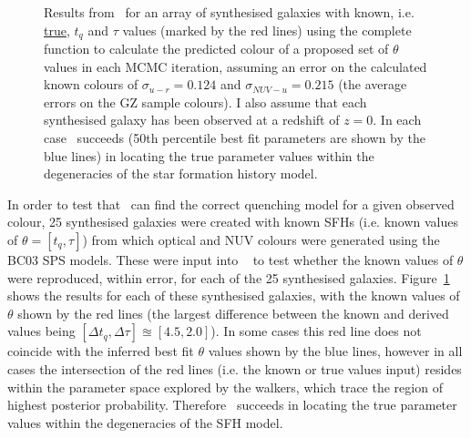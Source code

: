 \begin{figure}
\caption[Testing \starpy]{Results from \starpy ~for an array of synthesised galaxies with known, i.e. \underline{true}, $t_q$ and $\tau$ values (marked by the red lines) using the complete function to calculate the predicted colour of a proposed set of $\theta$ values in each MCMC iteration, assuming an error on the calculated known colours of $\sigma_{u-r} = 0.124$ and $\sigma_{NUV-u} = 0.215$ (the average errors on the GZ sample colours). I also assume that each synthesised galaxy has been observed at a redshift of $z=0$. In each case \starpy ~succeeds (50th percentile best fit parameters are shown by the blue lines) in locating the true parameter values within the degeneracies of the star formation history model.}
\label{test_mosaic}
\end{figure}

In order to test that \starpy ~can find the correct quenching model for a given observed colour, 25 synthesised galaxies were created with known SFHs (i.e. known values of $\theta = [t_q, \tau]$) from which optical and NUV colours were generated using the BC03 SPS models. These were input into \starpy ~ to test whether the known values of $\theta$ were reproduced, within error, for each of the 25 synthesised galaxies. Figure~\ref{test_mosaic} shows the results for each of these synthesised galaxies, with the known values of $\theta$ shown by the red lines (the largest difference between the known and derived values being $[\Delta t_q, \Delta \tau] \approxeq [4.5, 2.0]$). In some cases this red line does not coincide with the inferred best fit $\theta$ values shown by the blue lines, however in all cases the intersection of the red lines (i.e. the known or true values input) resides within the parameter space explored by the walkers, which trace the region of highest posterior probability. Therefore \starpy\ succeeds in locating the true parameter values within the degeneracies of the SFH model. 

